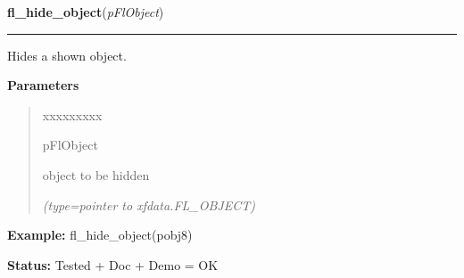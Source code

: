 \hspace{.8\funcindent}\begin{boxedminipage}{\funcwidth}

    \raggedright \textbf{fl\_hide\_object}(\textit{pFlObject})

    \vspace{-1.5ex}

    \rule{\textwidth}{0.5\fboxrule}
\setlength{\parskip}{2ex}
    Hides a shown object.

\setlength{\parskip}{1ex}
      \textbf{Parameters}
      \vspace{-1ex}

      \begin{quote}
        \begin{Ventry}{xxxxxxxxx}

          \item[pFlObject]

          object to be hidden

            {\it (type=pointer to xfdata.FL\_OBJECT)}

        \end{Ventry}

      \end{quote}

\textbf{Example:} fl\_hide\_object(pobj8)



\textbf{Status:} Tested + Doc + Demo = OK



    \end{boxedminipage}

    \label{xformslib:flbasic:fl_object_is_visible}

    \vspace{0.5ex}

